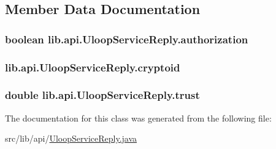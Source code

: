 \subsection{Member Data Documentation}
\hypertarget{classlib_1_1api_1_1UloopServiceReply_a9fe9ecb4fca6ed06fe77c70adf42be11}{
\subsubsection[{authorization}]{\setlength{\rightskip}{0pt plus 5cm}boolean lib.\+api.\+Uloop\+Service\+Reply.\+authorization\hspace{0.3cm}{\ttfamily [private]}}}\label{classlib_1_1api_1_1UloopServiceReply_a9fe9ecb4fca6ed06fe77c70adf42be11}
\hypertarget{classlib_1_1api_1_1UloopServiceReply_a3be01631c077de8781d55e2f2ea09440}{
\subsubsection[{cryptoid}]{ lib.\+api.\+Uloop\+Service\+Reply.\+cryptoid\hspace{0.3cm}{\ttfamily [private]}}}\label{classlib_1_1api_1_1UloopServiceReply_a3be01631c077de8781d55e2f2ea09440}
\hypertarget{classlib_1_1api_1_1UloopServiceReply_a5ad9fd3217140d290e9704e55dd6dc3b}{
\subsubsection[{trust}]{\setlength{\rightskip}{0pt plus 5cm}double lib.\+api.\+Uloop\+Service\+Reply.\+trust\hspace{0.3cm}{\ttfamily [private]}}}\label{classlib_1_1api_1_1UloopServiceReply_a5ad9fd3217140d290e9704e55dd6dc3b}


The documentation for this class was generated from the following file\+:\begin{DoxyCompactItemize}
\item 
src/lib/api/\hyperlink{UloopServiceReply_8java}{Uloop\+Service\+Reply.\+java}\end{DoxyCompactItemize}
